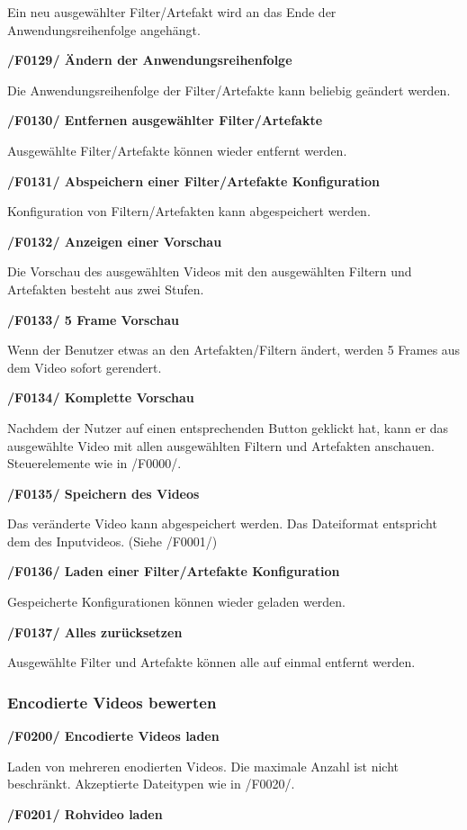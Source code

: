 \documentclass[parskip=full]{scrartcl}
\begin{document}
Ein neu ausgewählter Filter/Artefakt wird an das Ende der Anwendungsreihenfolge angehängt.

\textbf{/F0129/ Ändern der Anwendungsreihenfolge}

Die Anwendungsreihenfolge der Filter/Artefakte kann beliebig geändert werden.

\textbf{/F0130/ Entfernen ausgewählter Filter/Artefakte}

Ausgewählte Filter/Artefakte können wieder entfernt werden.

\textbf{/F0131/ Abspeichern einer Filter/Artefakte Konfiguration}

Konfiguration von Filtern/Artefakten kann abgespeichert werden.

\textbf{/F0132/ Anzeigen einer Vorschau}

Die Vorschau des ausgewählten Videos mit den ausgewählten Filtern und Artefakten besteht aus zwei Stufen.

\textbf{/F0133/ 5 Frame Vorschau}

Wenn der Benutzer etwas an den Artefakten/Filtern ändert, werden 5 Frames aus dem Video sofort gerendert.

\textbf{/F0134/ Komplette Vorschau}

Nachdem der Nutzer auf einen entsprechenden Button geklickt hat, kann er das ausgewählte Video mit allen ausgewählten Filtern und Artefakten anschauen. Steuerelemente wie in /F0000/.

\textbf{/F0135/ Speichern des Videos}

Das veränderte Video kann abgespeichert werden. Das Dateiformat entspricht dem des Inputvideos. (Siehe /F0001/)

\textbf{/F0136/ Laden einer Filter/Artefakte Konfiguration}

Gespeicherte Konfigurationen können wieder geladen werden.

\textbf{/F0137/ Alles zurücksetzen}

Ausgewählte Filter und Artefakte können alle auf einmal entfernt werden.
\subsubsection{Encodierte Videos bewerten}
\textbf{/F0200/ Encodierte Videos laden}

Laden von mehreren enodierten Videos. Die maximale Anzahl ist nicht beschränkt. Akzeptierte Dateitypen wie in /F0020/.

\textbf{/F0201/ Rohvideo laden}
\end{document}
